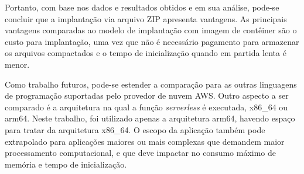 \documentclass[conference]{IEEEtran}
\begin{document}
Portanto, com base nos dados e resultados obtidos e em sua análise, pode-se concluir que a implantação via arquivo ZIP apresenta vantagens. As principais vantagens comparadas ao modelo de implantação com imagem de contêiner são o custo para implantação, uma vez que não é necessário pagamento para armazenar os arquivos compactados e o tempo de inicialização quando em partida lenta é menor.  

Como trabalho futuros, pode-se estender a comparação para as outras linguagens de programação suportadas pelo provedor de nuvem AWS. Outro aspecto a ser comparado é a arquitetura na qual a função \textit{serverless} é executada, x86\_64 ou arm64. Neste trabalho, foi utilizado apenas a arquitetura arm64, havendo espaço para tratar da arquitetura x86\_64. O escopo da aplicação também pode extrapolado para aplicações maiores ou mais complexas que demandem maior processamento computacional, e que deve impactar no consumo máximo de memória e tempo de inicialização.




\end{document}
